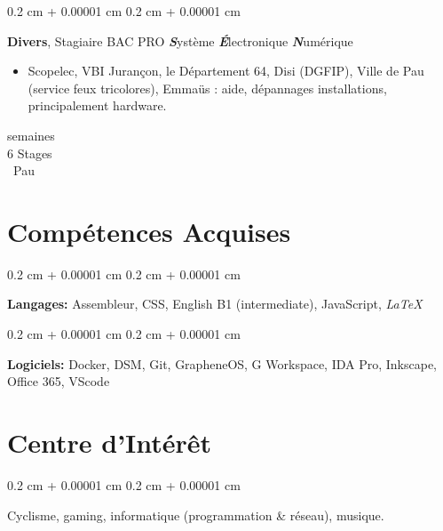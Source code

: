 \documentclass[11pt, a4paper]{article}
\newenvironment{highlights}{
    \begin{itemize}[
        topsep=0.10 cm,
        parsep=0.10 cm,
        partopsep=0pt,
        itemsep=0pt,
        leftmargin=0.4 cm + 10pt
    ]
}{
    \end{itemize}
} %
\newenvironment{onecolentry}{
    \begin{adjustwidth}{
        0.2 cm + 0.00001 cm
    }{
        0.2 cm + 0.00001 cm
    }
}{
    \end{adjustwidth}
} %
\newenvironment{twocolentry}[2][]{
    \onecolentry
    \def\secondColumn{#2}
    \setcolumnwidth{\fill, 4.5 cm}
    \begin{paracol}{2}
}{
    \switchcolumn \raggedleft \secondColumn
    \end{paracol}
    \endonecolentry
} %
\begin{document}
        \begin{twocolentry}{
            25 semaines \\
            6 Stages \\
            \approx Pau
        }
            \textbf{Divers}, Stagiaire BAC PRO \textbf{\textit{S}}ystème \textbf{\textit{É}}lectronique \textbf{\textit{N}}umérique
            \begin{highlights}
                \item Scopelec, VBI Jurançon, le Département 64, Disi (DGFIP), Ville de Pau (service feux tricolores), Emmaüs : aide, dépannages installations, principalement hardware.
            \end{highlights}
        \end{twocolentry}

    
    \section{Compétences Acquises}
        
        \begin{onecolentry}
            \textbf{Langages:} Assembleur, CSS, English B1 (intermediate), JavaScript, \textit{\LaTeX}
        \end{onecolentry}

        \vspace{0.2 cm}

        \begin{onecolentry}
            \textbf{Logiciels:} Docker, DSM, Git, GrapheneOS, G Workspace, IDA Pro, Inkscape, Office 365, VScode
        \end{onecolentry}


    \section{Centre d'Intérêt}
        \begin{onecolentry}
            Cyclisme, gaming, informatique (programmation \& réseau), musique.
        \end{onecolentry}
    
\end{document}
